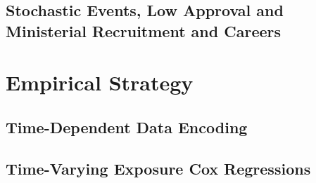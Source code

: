 \documentclass[12pt,halfline,a4paper]{ouparticle}
\begin{document}
\subsection{Stochastic Events, Low Approval and Ministerial Recruitment and Careers}
\label{sec2.1}

\section{Empirical Strategy}
\label{sec3}

\subsection{Time-Dependent Data Encoding}
\label{sec3.1}

\subsection{Time-Varying Exposure Cox Regressions}
\label{sec3.2}



\end{document}
